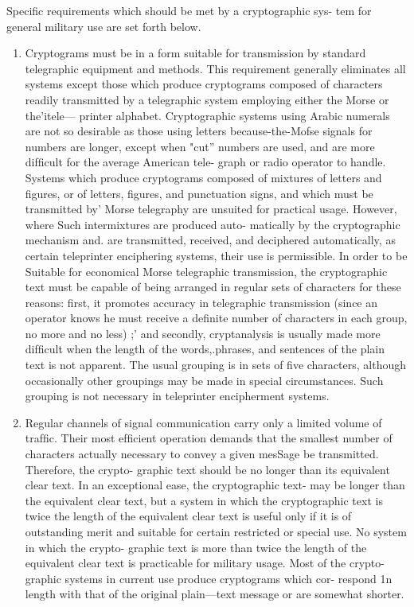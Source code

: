 \mypara Specific requirements which should be met by a cryptographic sys-
tem for general military use are set forth below.

\begin{enumerate}
\item Cryptograms must be in a form suitable for transmission by
standard telegraphic equipment and methods. This requirement
generally eliminates all systems except those which produce
cryptograms composed of characters readily transmitted by a
telegraphic system employing either the Morse or the'itele—
printer alphabet. Cryptographic systems using Arabic numerals
are not so desirable as those using letters because-the-Mofse
signals for numbers are longer, except when "cut” numbers
are used, and are more difﬁcult for the average American tele-
graph or radio operator to handle. Systems which produce
cryptograms composed of mixtures of letters and ﬁgures, or
of letters, ﬁgures, and punctuation signs, and which must be
transmitted by' Morse telegraphy are unsuited for practical
usage. However, where Such intermixtures are produced auto-
matically by the cryptographic mechanism and. are transmitted,
received, and deciphered automatically, as certain teleprinter
enciphering systems, their use is permissible. In order to be
Suitable for economical Morse telegraphic transmission, the
cryptographic text must be capable of being arranged in regular
sets of characters for these reasons: ﬁrst, it promotes accuracy
in telegraphic transmission (since an operator knows he must
receive a definite number of characters in each group, no more
and no less) ;' and secondly, cryptanalysis is usually made more
difﬁcult when the length of the words,.phrases, and sentences
of the plain text is not apparent. The usual grouping is in sets
of ﬁve characters, although occasionally other groupings may
be made in special circumstances. Such grouping is not necessary
in teleprinter encipherment systems.
\item Regular channels of signal communication carry only a 
limited volume of trafﬁc. Their most efﬁcient operation demands
that the smallest number of characters actually necessary to
convey a given mesSage be transmitted. Therefore, the crypto-
graphic text should be no longer than its equivalent clear text.
In an exceptional ease, the cryptographic text- may be longer
than the equivalent clear text, but a system in which the
cryptographic text is twice the length of the equivalent clear
text is useful only if it is of outstanding merit and suitable for
certain restricted or special use. No system in which the crypto-
graphic text is more than twice the length of the equivalent
clear text is practicable for military usage. Most of the crypto-
graphic systems in current use produce cryptograms which cor-
respond 1n length with that of the original plain—text message
or are somewhat shorter.


\end{enumerate}
